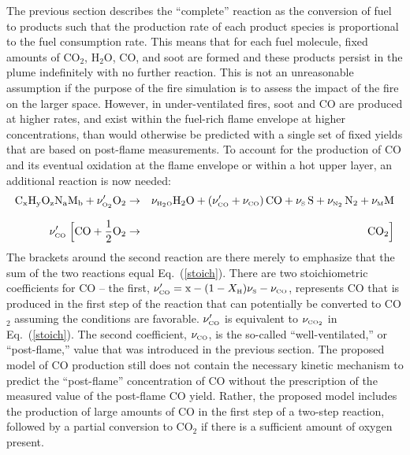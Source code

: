 \documentclass[11pt]{book}
\begin{document}
\label{co_production}

The previous section describes the ``complete'' reaction as the conversion of fuel to
products such that the production rate of each product species is proportional to the fuel consumption rate.
This means that for each fuel molecule, fixed amounts of CO$_2$, H$_2$O, CO, and soot are formed and these products
persist in the plume indefinitely with no further reaction. This is not an unreasonable assumption if
the purpose of the fire simulation is to assess the impact of the fire on the larger space.
However, in under-ventilated fires, soot and CO are produced at higher rates,
and exist within the fuel-rich flame envelope at higher concentrations,
than would otherwise be predicted with a single set of fixed yields that are based on post-flame measurements. To account for the
production of CO and its eventual oxidation at the flame envelope or within a hot upper layer,
an additional reaction is now needed:
\begin{eqnarray}
\mathrm{C_xH_yO_zN_aM_b} +  \nu_{\tiny \hbox{O}_2}' \mathrm{O_2}  &\rightarrow&  \nu_{\tiny \hbox{H}_2\hbox{O}} \mathrm{H_2O} + (\nu_{\tiny \hbox{CO}}'+ \nu_{\tiny \hbox{CO}}) \, \mathrm{CO} +
     \nu_{\tiny \hbox{S}} \, \mathrm{S}  + \nu_{\tiny \hbox{N}_2} \, \mathrm{N_2} + \nu_{\tiny \hbox{M}} \mathrm{M}  \\*[.1in]
\nu_{\tiny \hbox{CO}}' \; \Big[ \mathrm{CO} + \frac{1}{2} \mathrm{O_2}  &\rightarrow&  \mathrm{CO_2}  \Big]
\label{3reac} \end{eqnarray}
The brackets around the second reaction are there merely to emphasize that the sum of the two reactions equal Eq.~(\ref{stoich}).
There are two stoichiometric coefficients for CO -- the first, $\nu_{\tiny \hbox{CO}}'=\hbox{x}-(1-X_{\tiny \hbox{H}}) \nu_{\tiny \hbox{S}}-\nu_{\tiny \hbox{CO}}$,
represents CO that is produced in the first
step of the reaction that can potentially be converted to CO$_2$ assuming the conditions are favorable. $\nu_{\tiny \hbox{CO}}'$ is equivalent to $\nu_{\tiny \hbox{CO}_2}$ in
Eq.~(\ref{stoich}). The second coefficient, $\nu_{\tiny \hbox{CO}}$,
is the so-called ``well-ventilated,'' or ``post-flame,'' value that was introduced in the previous section. The proposed model of CO production
still does not contain the necessary kinetic mechanism to predict the ``post-flame'' concentration of CO without the prescription of the
measured value of the post-flame CO yield. Rather, the proposed model includes the production of large amounts of CO in the first step of a two-step
reaction, followed by a partial conversion to CO$_2$ if there is a sufficient amount of oxygen present.
\end{document}
